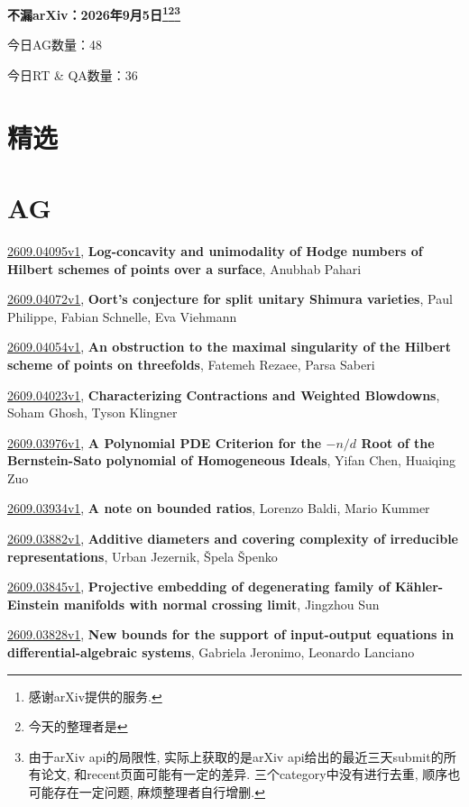 \documentclass[9pt, a4paper]{article}
\theoremstyle{plain}
\theoremstyle{definition}
\theoremstyle{remark}
\newcommand{\arxiv}[3]{\href{https://arxiv.org/abs/#1}{#1}, \textbf{\textcolor{arxivblue}{#2}}, #3}
\newcommand{\AGnumber}{48}
\newcommand{\RTQAnumber}{36}
\newcommand{\NewestDate}{2026年9月5日}
\newcommand{\todayarXiver}{} %
\begin{document}
\begin{center}
    \Huge\textbf{不漏arXiv：\NewestDate\footnote{感谢arXiv提供的服务.}\footnote{今天的整理者是\todayarXiver}\footnote{由于arXiv api的局限性, 实际上获取的是arXiv api给出的最近三天submit的所有论文, 和recent页面可能有一定的差异. 三个category中没有进行去重, 顺序也可能存在一定问题, 麻烦整理者自行增删.}} \\
\end{center}

\setcounter{section}{-1}

\begin{center}
    今日AG数量：\AGnumber
    
    今日RT \& QA数量：\RTQAnumber
    
\end{center}


\section{精选}


\section{AG}
\arxiv{2609.04095v1}{Log-concavity and unimodality of Hodge numbers of Hilbert schemes of points over a surface}{Anubhab Pahari}

\arxiv{2609.04072v1}{Oort's conjecture for split unitary Shimura varieties}{Paul Philippe, Fabian Schnelle, Eva Viehmann}

\arxiv{2609.04054v1}{An obstruction to the maximal singularity of the Hilbert scheme of points on threefolds}{Fatemeh Rezaee, Parsa Saberi}

\arxiv{2609.04023v1}{Characterizing Contractions and Weighted Blowdowns}{Soham Ghosh, Tyson Klingner}

\arxiv{2609.03976v1}{A Polynomial PDE Criterion for the $-n/d$ Root of the Bernstein-Sato polynomial of Homogeneous Ideals}{Yifan Chen, Huaiqing Zuo}

\arxiv{2609.03934v1}{A note on bounded ratios}{Lorenzo Baldi, Mario Kummer}

\arxiv{2609.03882v1}{Additive diameters and covering complexity of irreducible representations}{Urban Jezernik, Špela Špenko}

\arxiv{2609.03845v1}{Projective embedding of degenerating family of Kähler-Einstein manifolds with normal crossing limit}{Jingzhou Sun}

\arxiv{2609.03828v1}{New bounds for the support of input-output equations in differential-algebraic systems}{Gabriela Jeronimo, Leonardo Lanciano}
\end{document}
